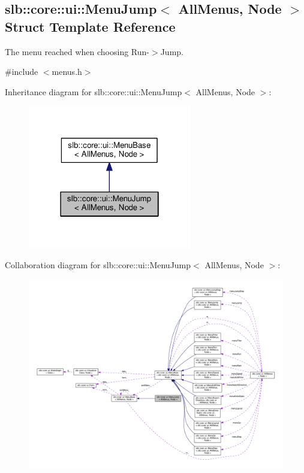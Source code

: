 \hypertarget{structslb_1_1core_1_1ui_1_1MenuJump}{}\subsection{slb\+:\+:core\+:\+:ui\+:\+:Menu\+Jump$<$ All\+Menus, Node $>$ Struct Template Reference}
\label{structslb_1_1core_1_1ui_1_1MenuJump}


The menu reached when choosing Run-\/$>$Jump.  




{\ttfamily \#include $<$menus.\+h$>$}



Inheritance diagram for slb\+:\+:core\+:\+:ui\+:\+:Menu\+Jump$<$ All\+Menus, Node $>$\+:\nopagebreak
\begin{figure}[H]
\begin{center}
\leavevmode
\includegraphics[width=202pt]{structslb_1_1core_1_1ui_1_1MenuJump__inherit__graph}
\end{center}
\end{figure}


Collaboration diagram for slb\+:\+:core\+:\+:ui\+:\+:Menu\+Jump$<$ All\+Menus, Node $>$\+:\nopagebreak
\begin{figure}[H]
\begin{center}
\leavevmode
\includegraphics[width=350pt]{structslb_1_1core_1_1ui_1_1MenuJump__coll__graph}
\end{center}
\end{figure}
